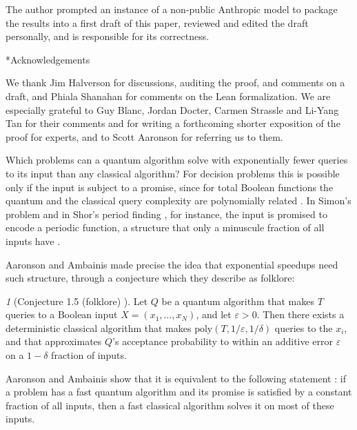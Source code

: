 \documentclass[11pt,reqno]{amsart}
\makeatletter
\newcommand{\modelname}{a non-public Anthropic model}
\theoremstyle{definition}
\theoremstyle{remark}
\numberwithin{equation}{section}
\theoremstyle{named}
\newtheorem*{named}{}
\theoremstyle{plain}
\renewcommand{\section}{\@startsection{section}{1}%
  \z@{1.3\linespacing\@plus.7\linespacing}{.65\linespacing}{\normalfont\scshape\centering}}
\newcommand{\eps}{\varepsilon}
\makeatother
\begin{document}
The author prompted an instance of \modelname{} to package the results into a first draft of this
paper, reviewed and edited the draft personally, and is responsible for its correctness.

\section*{Acknowledgements}

We thank Jim Halverson for discussions, auditing the proof, and comments on a draft, and Phiala Shanahan for comments on the
Lean formalization. We are especially grateful to 
Guy Blanc, Jordan Docter, Carmen Strassle and Li-Yang Tan for their comments and for writing a forthcoming
shorter exposition of the proof for experts, and to Scott Aaronson for referring us to them.

\vspace*{\fill}

\newpage

{\small\tableofcontents}

\linespread{1.08}\selectfont
\section{Introduction}\label{sec:intro}

Which problems can a quantum algorithm solve with exponentially fewer queries to its input than any
classical algorithm? For decision problems this is possible only if the input is subject to a
promise, since for total Boolean functions the quantum and the classical query complexity are
polynomially related \cite{BBCMW}. In Simon's problem \cite{Sim} and in Shor's period finding
\cite{Sho}, for instance, the input is promised to encode a periodic function, a structure that only a
minuscule fraction of all inputs have \cite{AA14}.

Aaronson and Ambainis made precise the idea that exponential speedups need such structure, through a
conjecture which they describe as folklore:

\begin{named}[Conjecture 1.5 {\normalfont(folklore) \cite{AA14}}]
Let $Q$ be a quantum algorithm that makes $T$ queries to a Boolean input $X=(x_1,\dots,x_N)$, and
let $\eps>0$. Then there exists a deterministic classical algorithm that makes
$\mathrm{poly}(T,1/\eps,1/\delta)$ queries to the $x_i$, and that approximates $Q$'s acceptance
probability to within an additive error $\eps$ on a $1-\delta$ fraction of inputs.
\end{named}
Aaronson
and Ambainis show that it is equivalent to the following statement \cite[Theorem~7.3]{AA14}: if a
problem has a fast quantum algorithm and its promise is satisfied by a constant fraction of all
inputs, then a fast classical algorithm solves it on most of these inputs.
\end{document}
